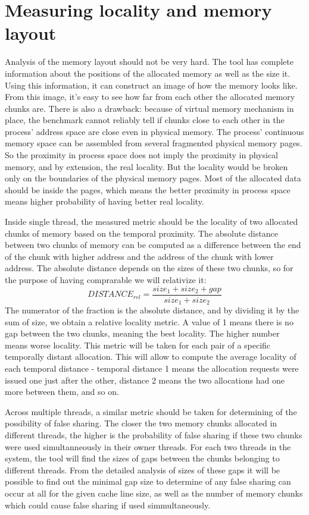 \section{Measuring locality and memory layout}

Analysis of the memory layout should not be very hard. The tool has complete information about the positions of the allocated memory as well as the size it. Using this information, it can construct an image of how the memory looks like. From this image, it's easy to see how far from each other the allocated memory chunks are. There is also a drawback: because of virtual memory mechanism in place, the benchmark cannot reliably tell if chunks close to each other in the process' address space are close even in physical memory. The process' continuous memory space can be assembled from several fragmented physical memory pages. So the proximity in process space does not imply the proximity in physical memory, and by extension, the real locality. But the locality would be broken only on the boundaries of the physical memory pages. Most of the allocated data should be inside the pages, which means the better proximity in process space means higher probability of having better real locality.

Inside single thread, the measured metric should be the locality of two allocated chunks of memory based on the temporal proximity. The absolute distance between two chunks of memory can be computed as a difference between the end of the chunk with higher address and the address of the chunk with lower address. The absolute distance depends on the sizes of these two chunks, so for the purpose of having comprarable we will relativize it:
\begin{displaymath}
DISTANCE_{rel} = \frac{size_1 + size_2 + gap}{size_1 + size_2}
\end{displaymath}
The numerator of the fraction is the absolute distance, and by dividing it by the sum of size, we obtain a relative locality metric. A value of 1 means there is no gap between the two chunks, meaning the best locality. The higher number means worse locality. This metric will be taken for each pair of a specific temporally distant allocation. This will allow to compute the average locality of each temporal distance - temporal distance 1 means the allocation requests were issued one just after the other, distance 2 means the two allocations had one more between them, and so on.

Across multiple threads, a similar metric should be taken for determining of the possibility of false sharing. The closer the two memory chunks allocated in different threads, the higher is the probability of false sharing if these two chunks were used simultanneously in their owner threads. For each two threads in the system, the tool will find the sizes of gaps between the chunks belonging to different threads. From the detailed analysis of sizes of these gaps it will be possible to find out the minimal gap size to determine of any false sharing can occur at all for the given cache line size, as well as the number of memory chunks which could cause false sharing if used simmultaneously.

